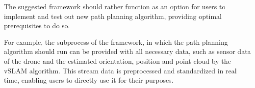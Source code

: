 \begin{enumerate}
 The suggested framework should rather function as an option for users to implement and test out new path planning algorithm, providing optimal 
 prerequisites to do so. 
 
 For example, the subprocess of the framework, in which the path planning algorithm should run can be provided with all necessary data, 
 such as sensor data of the drone and the estimated orientation, position and point cloud by the vSLAM algorithm. This stream data is preprocessed 
 and standardized 
 in real time, enabling users to directly use it for their purposes. 
 
 
\end{enumerate} 
 
 




